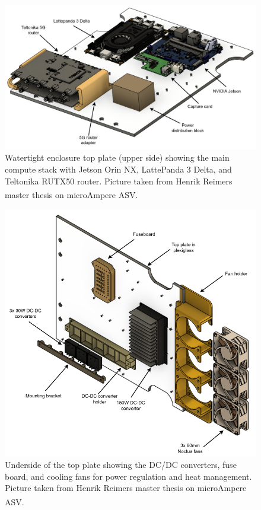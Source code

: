 \begin{figure}[H]
    \centering
    \includegraphics[width=0.9\linewidth]{Pictures/Hardware/Layout/BoxTopPlateTop.png}
    \caption{Watertight enclosure top plate (upper side) showing the main compute stack with Jetson Orin NX, LattePanda 3 Delta, and Teltonika RUTX50 router. Picture taken from Henrik Reimers master thesis on microAmpere ASV.\textsuperscript{\cite{microAmpere_hardware_master_thesis1}}}
    \label{fig:microAmpere-layout-topplate-top}
\end{figure}
\begin{figure}[H]
    \centering
    \includegraphics[width=0.8\linewidth]{Pictures/Hardware/Layout/BoxTopPlateBottom.png}
    \caption{Underside of the top plate showing the DC/DC converters, fuse board, and cooling fans for power regulation and heat management. Picture taken from Henrik Reimers master thesis on microAmpere ASV.\textsuperscript{\cite{microAmpere_hardware_master_thesis1}}}
    \label{fig:microAmpere-layout-topplate-bottom}
\end{figure}
